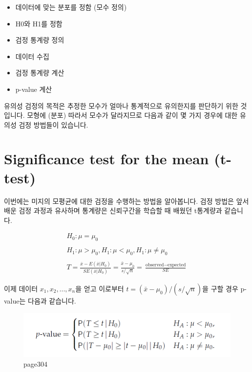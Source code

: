 \documentclass[
]{book}
\providecommand{\tightlist}{%
  \setlength{\itemsep}{0pt}\setlength{\parskip}{0pt}}
\begin{document}
\begin{itemize}
\tightlist
\item
  데이터에 맞는 분포를 정함 (모수 정의)
\item
  H0와 H1를 정함
\item
  검정 통계량 정의
\item
  데이터 수집
\item
  검정 통계량 계산
\item
  p-value 계산
\end{itemize}

유의성 검정의 목적은 추정한 모수가 얼마나 통계적으로 유의한지를 판단하기 위한 것 입니다. 모형에 (분포) 따라서 모수가 달라지므로 다음과 같이 몇 가지 경우에 대한 유의성 검정 방법들이 있습니다.

\hypertarget{significance-test-for-the-mean-t-test}{%
\section{Significance test for the mean (t-test)}\label{significance-test-for-the-mean-t-test}}

이번에는 미지의 모평균에 대한 검정을 수행하는 방법을 알아봅니다. 검정 방법은 앞서 배운 검정 과정과 유사하며 통계량은 신뢰구간을 학습할 때 배웠던 t통계량과 같습니다.

\[
\begin{split}
H_0: \mu = \mu_0 \\
\\
H_1: \mu > \mu_0, H_1: \mu < \mu_0, H_1: \mu \neq \mu_0 \\
\\
T = \frac{\bar{x} - E(\bar{x}|H_0)}{SE(\bar{x}|H_0)} = \frac{\bar{x} - \mu_0}{s / \sqrt{n}} = \frac{\text{observed} - \text{expected}}{SE} 
\end{split}
\]

이제 데이터 \(x_1, x_2, ..., x_n\)을 얻고 이로부터 \(t = (\bar{x}-\mu_0)/(s/\sqrt{n})\)을 구할 경우 p-value는 다음과 같습니다.

\begin{figure}
\centering
\includegraphics[width=5.20833in,height=\textheight]{./images/09/06.png}
\caption{page304}
\end{figure}
\end{document}
